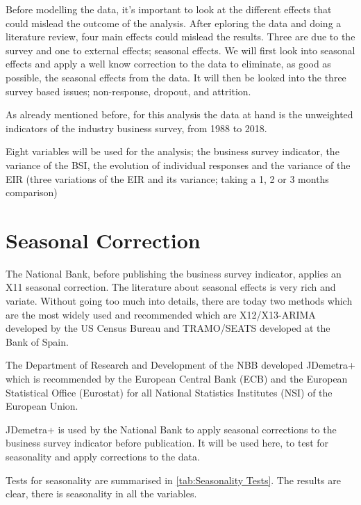 \documentclass[12pt,a4paper,oneside]{book}
\begin{document}
Before modelling the data, it's important to look at the different effects that could mislead the outcome of the analysis. After eploring the data and doing a literature review, four main effects could mislead the results. Three are due to the survey and one to external effects; seasonal effects. We will first look into seasonal effects and apply a well know correction to the data to eliminate, as good as possible, the seasonal effects from the data.
It will then be looked into the three survey based issues; non-response, dropout, and attrition.

As already mentioned before, for this analysis the data at hand is the unweighted indicators of the industry business survey, from 1988 to 2018.

Eight variables will be used for the analysis; the business survey indicator, the variance of the BSI, the evolution of individual responses and the variance of the EIR (three variations of the EIR and its variance; taking a 1, 2 or 3 months comparison) 

\section{Seasonal Correction}
\label{sec:seasonal correction}

The National Bank, before publishing the business survey indicator, applies an X11 seasonal correction.
The literature about seasonal effects is very rich and variate. Without going too much into details, there are today two methods which are the most widely used and recommended which are X12/X13-ARIMA developed by the US Census Bureau and TRAMO/SEATS developed at the Bank of Spain. 

The Department of Research and Development of the NBB developed JDemetra+ which is recommended by the European Central Bank (ECB) and the European Statistical Office (Eurostat) for all National Statistics Institutes (NSI) of the European Union. 

JDemetra+ is used by the National Bank to apply seasonal corrections to the business survey indicator before publication. It will be used here, to test for seasonality and apply corrections to the data.

Tests for seasonality are summarised in \autoref{tab:Seasonality Tests}. The results are clear, there is seasonality in all the variables.
\end{document}
